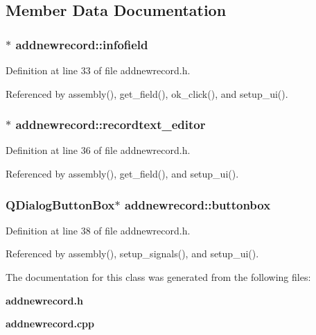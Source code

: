 \subsection{Member Data Documentation}
\subsubsection{$\ast$ {\bf addnewrecord::infofield}\hspace{0.3cm}{\tt  [private]}}\label{classaddnewrecord_5f573afbfe718aefdd10d4750cca6337}




Definition at line 33 of file addnewrecord.h.

Referenced by assembly(), get\_\-field(), ok\_\-click(), and setup\_\-ui().
\subsubsection{$\ast$ {\bf addnewrecord::recordtext\_\-editor}\hspace{0.3cm}{\tt  [private]}}\label{classaddnewrecord_fe979c440192b2306b4c895b9b4f6107}




Definition at line 36 of file addnewrecord.h.

Referenced by assembly(), get\_\-field(), and setup\_\-ui().
\subsubsection{\setlength{\rightskip}{0pt plus 5cm}QDialog\-Button\-Box$\ast$ {\bf addnewrecord::buttonbox}\hspace{0.3cm}{\tt  [private]}}\label{classaddnewrecord_7f1498c7dede5dd0458b9efc867ddaa7}




Definition at line 38 of file addnewrecord.h.

Referenced by assembly(), setup\_\-signals(), and setup\_\-ui().

The documentation for this class was generated from the following files:\begin{CompactItemize}
\item 
{\bf addnewrecord.h}\item 
{\bf addnewrecord.cpp}\end{CompactItemize}
